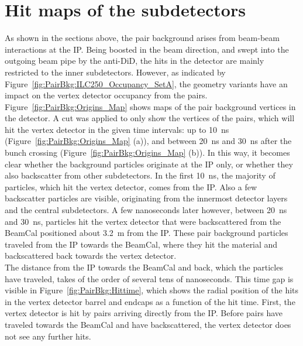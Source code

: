 \section{Hit maps of the \sid subdetectors}
\label{PairBkg:hitmaps}
As shown in the sections above, the \positron\electron pair background arises from beam-beam interactions at the IP.
Being boosted in the beam direction, and swept into the outgoing beam pipe by the anti-DiD, the hits in the \sid detector are mainly restricted to the inner subdetectors.
However, as indicated by Figure~\ref{fig:PairBkg:ILC250_Occupancy_SetA}, the \sid geometry variants have an impact on the vertex detector occupancy from the \positron\electron pairs.
\\Figure~\ref{fig:PairBkg:Origins_Map} shows maps of the pair background vertices in the \sid detector.
A cut was applied to only show the vertices of the pairs, which will hit the vertex detector in the given time intervals: up to \SI{10}{\nano\second} (Figure~\ref{fig:PairBkg:Origins_Map} (a)), and between \SI{20}{\nano\second} and \SI{30}{\nano\second} after the bunch crossing (Figure~\ref{fig:PairBkg:Origins_Map} (b)).
In this way, it becomes clear whether the background particles originate at the IP only, or whether they also backscatter from other subdetectors.
In the first \SI{10}{\nano\second}, the majority of particles, which hit the vertex detector, comes from the IP.
Also a few backscatter particles are visible, originating from the innermost detector layers and the central subdetectors.
A few nanoseconds later however, between \SI{20}{\nano\second} and \SI{30}{\nano\second}, particles hit the vertex detector that were backscattered from the BeamCal positioned about \SI{3.2}{\meter} from the IP.
These pair background particles traveled from the IP towards the BeamCal, where they hit the material and backscattered back towards the vertex detector.
\\The distance from the IP towards the BeamCal and back, which the particles have traveled, takes of the order of several tens of nanoseconds.
This time gap is visible in Figure~\ref{fig:PairBkg:Hittime}, which shows the radial position of the hits in the vertex detector barrel and endcaps as a function of the hit time.
First, the vertex detector is hit by \positron\electron pairs arriving directly from the IP.
Before pairs have traveled towards the BeamCal and have backscattered, the vertex detector does not see any further hits.

